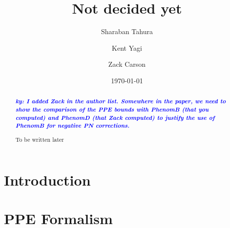 \documentclass[prd,twocolumn,nofootinbib]{revtex4-1}
\newcommand{\ky}[1]{\textcolor{blue}{\it{\textbf{ky: #1}}} }
\begin{document}
\title{Not decided yet}

\author{Sharaban Tahura}

\author{Kent Yagi}

\author{Zack Carson}

\begin{abstract}
\ky{I added Zack in the author list. Somewhere in the paper, we need to show the comparison of the PPE bounds with PhenomB (that you computed) and PhenomD (that Zack computed) to justify the use of PhenomB for negative PN corrections.}

To be written later
\end{abstract}

\date{\today}




\maketitle




\section{Introduction}

\section{PPE Formalism}\label{section:ppE}
\end{document}
